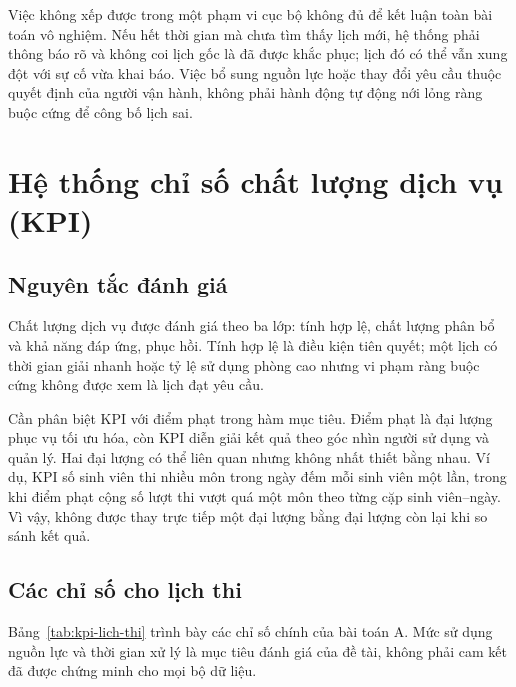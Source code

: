 Việc không xếp được trong một phạm vi cục bộ không đủ để kết luận toàn bài toán vô nghiệm. Nếu hết thời gian mà chưa tìm thấy lịch mới, hệ thống phải thông báo rõ và không coi lịch gốc là đã được khắc phục; lịch đó có thể vẫn xung đột với sự cố vừa khai báo. Việc bổ sung nguồn lực hoặc thay đổi yêu cầu thuộc quyết định của người vận hành, không phải hành động tự động nới lỏng ràng buộc cứng để công bố lịch sai.

\section{Hệ thống chỉ số chất lượng dịch vụ (KPI)}
\label{sec:kpi}

\subsection{Nguyên tắc đánh giá}

Chất lượng dịch vụ được đánh giá theo ba lớp: tính hợp lệ, chất lượng phân bổ và khả năng đáp ứng, phục hồi. Tính hợp lệ là điều kiện tiên quyết; một lịch có thời gian giải nhanh hoặc tỷ lệ sử dụng phòng cao nhưng vi phạm ràng buộc cứng không được xem là lịch đạt yêu cầu.

Cần phân biệt KPI với điểm phạt trong hàm mục tiêu. Điểm phạt là đại lượng phục vụ tối ưu hóa, còn KPI diễn giải kết quả theo góc nhìn người sử dụng và quản lý. Hai đại lượng có thể liên quan nhưng không nhất thiết bằng nhau. Ví dụ, KPI số sinh viên thi nhiều môn trong ngày đếm mỗi sinh viên một lần, trong khi điểm phạt  cộng số lượt thi vượt quá một môn theo từng cặp sinh viên--ngày. Vì vậy, không được thay trực tiếp một đại lượng bằng đại lượng còn lại khi so sánh kết quả.

\subsection{Các chỉ số cho lịch thi}

Bảng~\ref{tab:kpi-lich-thi} trình bày các chỉ số chính của bài toán A. Mức sử dụng nguồn lực và thời gian xử lý là mục tiêu đánh giá của đề tài, không phải cam kết đã được chứng minh cho mọi bộ dữ liệu.

